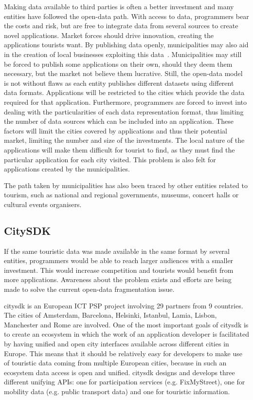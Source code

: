 \documentclass[times,doublespace]{ettauth}%
\begin{document}
Making data available to third parties is often a better investment and many entities have followed the open-data path.
With access to data, programmers bear the costs and risk, but are free to integrate data from several sources to create novel applications.
Market forces should drive innovation, creating the applications tourists want.
By publishing data openly, municipalities may also aid in the creation of local businesses exploiting this data~\cite{6525605}.
Municipalities may still be forced to publish some applications on their own, should they deem them necessary, but the market not believe them lucrative. 
Still, the open-data model is not without flaws as each entity publishes different datasets using different data formats.
Applications will be restricted to the cities which provide the data required for that application.
Furthermore, programmers are forced to invest into dealing with the particularities of each data representation format, thus limiting the number of data sources which can be included into an application.
These factors will limit the cities covered by applications and thus their potential market, limiting the number and size of the investments.
The local nature of the applications will make them difficult for tourist to find, as they must find the particular application for each city visited.
This problem is also felt for applications created by the municipalities.

The path taken by municipalities has also been traced by other entities related to tourism, such as national and regional governments, museums, concert halls or cultural events organisers.

\subsection{CitySDK}
\label{s:citysdk}

If the same touristic data was made available in the same format by several entities, programmers would be able to reach larger audiences with a smaller investment. 
This would increase competition and tourists would benefit from more applications.
Awareness about the problem exists and efforts are being made to solve the current open-data fragmentation issue.

\ac{citysdk} is an European ICT PSP project involving 29 partners from 9 countries.
The cities of Amsterdam, Barcelona, Helsinki, Istanbul, Lamia, Lisbon, Manchester and Rome are involved.
One of the most important goals of \ac{citysdk} is to create an ecosystem in which the work of an application developer is facilitated by having unified and open city interfaces available across different cities in Europe. 
This means that it should be relatively easy for developers to make use of touristic data coming from multiple European cities, because in such an ecosystem data access is open and unified. 
\ac{citysdk} designs and develops three different unifying APIs: one for participation services (e.g. FixMyStreet), one for mobility data (e.g. public transport data) and one for touristic information. 
 
\end{document}
